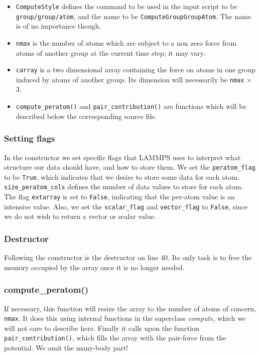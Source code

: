 \documentclass[twoside,english]{uiofysmaster}
\begin{document}
\begin{itemize}
\item \texttt{ComputeStyle} defines the command to be used in the input script to be \linebreak[1] \texttt{group/group/atom}, and the name to be \texttt{ComputeGroupGroupAtom}. 
	The name is of no importance though. 
\item \texttt{nmax} is the number of atoms which are subject to a non zero force from atoms of another group at the current time step; it may vary.

\item \texttt{carray} is a two dimensional array containing the force on atoms in one group induced by atoms of another group. Its dimension will necessarily be \texttt{nmax} $\times$ 3.

\item \texttt{compute\_peratom()} and \texttt{pair\_contribution()} are functions which will be described below the corresponding source file. 
\end{itemize}




\subsubsection{Setting flags}
In the constructor we set specific flags that LAMMPS uses to interpret what structure our data should have, and how to store them. 
We set the \texttt{peratom\_flag} to be \texttt{True}, which indicates that we desire to store some data for each atom. 
\texttt{size\_peratom\_cols} defines the number of data values to store for each atom. 
The flag \texttt{extarray} is set to \texttt{False}, indicating that the per-atom value is an intensive value. 
Also, we set the \texttt{scalar\_flag} and \texttt{vector\_flag} to \texttt{False}, since we do not wish to return a vector or scalar value.

\subsubsection{Destructor}
Following the constructor is the destructor on line 40. Its only task is to free the memory occupied by the array once it is no longer needed.  

\subsubsection{compute\_peratom()}
 If necessary, this function will resize the array to the number of atoms of concern, \texttt{nmax}. 
 It does this using internal functions in the superclass \textit{compute}, which we will not care to describe here. 
 Finally it calls upon the function \texttt{pair\_contribution()}, which fills the array with the pair-force from the potential. {\huge  We omit the many-body part!}
\end{document}
